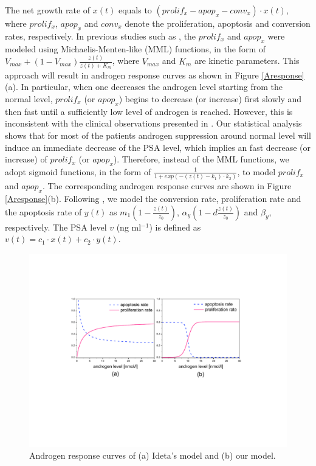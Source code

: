 The net growth rate of $x(t)$ equals to $(prolif_{x}-apop_{x}-conv_{x})\cdot x(t)$, where $prolif_x$, $apop_x$ and $conv_x$ denote the proliferation, apoptosis and conversion rates, respectively. In previous studies such as \cite{jackson04a,jackson04b,ideta08}, the $prolif_x$ and $apop_x$ were modeled using Michaelis-Menten-like (MML) functions, in the form of $V_{max}+(1-V_{max})\frac{z(t)}{z(t)+K_{m}}$, where $V_{max}$ and $K_m$ are kinetic parameters. This approach will result in androgen response curves as shown in Figure \ref{Aresponse}(a). In particular, when one decreases the androgen level starting from the normal level, $prolif_x$ (or $apop_x$) begins to decrease (or increase) first slowly and then fast until a sufficiently low level of androgen is reached. However, this is inconsistent with the clinical observations presented in \cite{bruchovsky06, bruchovsky07}. Our statistical analysis shows that for most of the patients androgen suppression around normal level will induce an immediate decrease of the PSA level, which implies an fast decrease (or increase) of $prolif_x$ (or $apop_x$). Therefore, instead of the MML functions, we adopt sigmoid functions, in the form of  $\frac{1}{1+exp(-(z(t)-k_1)\cdot k_2)}$, to model $prolif_x$ and $apop_x$. The corresponding androgen response curves are shown in Figure \ref{Aresponse}(b). Following \cite{ideta08}, we model the conversion rate, proliferation rate and the apoptosis rate of $y(t)$ as $m_1(1-\frac{z(t)}{z_0})$, $\alpha_y(1-d\frac{z(t)}{z_0})$ and $\beta_y$, respectively. The PSA level $v$ (ng ml$^{-1}$) is defined as $v(t)=c_1\cdot x(t)+c_2\cdot y(t)$. 

\begin{figure}[htb]
\centering
\includegraphics[scale=0.5]{fig-response}
\caption{Androgen response curves of (a) Ideta's model and (b) our model.}
\label{response}
\end{figure}



